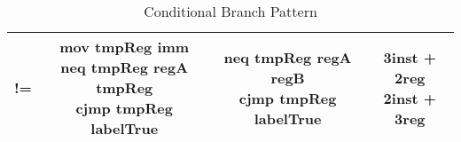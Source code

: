 \begin{table}[!ht]
{\begin{tabular}{|c|c|c|c|}
            != & \makecell{mov tmpReg imm \\ neq tmpReg regA tmpReg \\ cjmp tmpReg labelTrue} & \makecell{neq tmpReg regA regB \\ cjmp tmpReg labelTrue} & \makecell{3inst + 2reg \\ 2inst + 3reg} \\ \hline
        \end{tabular}}
    \caption{Conditional Branch Pattern}
    \label{table:conditional-branch-pattern}
\end{table}
